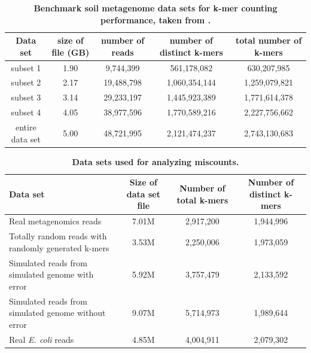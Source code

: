 \documentclass[10pt]{article}
\begin{document}
\begin{table}[!ht]
\caption{
\bf{Benchmark soil metagenome data sets for k-mer counting performance, taken from
\cite{Howe2012}.}}
\begin{tabular}{ |c | c |c| c|c| }
\hline
Data set & size of file (GB) & number of reads & number of distinct
k-mers & total number of k-mers \\
\hline
subset 1        & 1.90 &  9,744,399 &   561,178,082 &   630,207,985 \\
subset 2        & 2.17 & 19,488,798 & 1,060,354,144 & 1,259,079,821 \\
subset 3        & 3.14 & 29,233,197 & 1,445,923,389 & 1,771,614,378 \\
subset 4        & 4.05 & 38,977,596 & 1,770,589,216 & 2,227,756,662 \\
entire data set & 5.00 & 48,721,995 & 2,121,474,237 & 2,743,130,683 \\
\end{tabular}
\begin{flushleft}
\end{flushleft}
\label{table:datasets}
\end{table}



% 


\begin{table}[!ht]
\caption{
\bf{Data sets used for analyzing miscounts.}}
\begin{tabular}{ | p{5cm} | c | c | c |}
\hline
Data set & Size of data set file & Number of total k-mers & Number of distinct k-mers \\
\hline
Real metagenomics reads                                  & 7.01M  & 2,917,200  & 1,944,996 \\
\hline
Totally random reads with randomly generated k-mers      & 3.53M  & 2,250,006  & 1,973,059 \\
\hline
Simulated reads from simulated genome with error         & 5.92M  & 3,757,479  & 2,133,592 \\
\hline
Simulated reads from simulated genome without error      & 9.07M  & 5,714,973  & 1,989,644 \\
\hline
Real {\em E. coli} reads                                        & 4.85M  & 4,004,911  & 2,079,302 \\
\end{tabular}
\begin{flushleft}
\end{flushleft}
\label{table:random_data}
\end{table}
\end{document}
